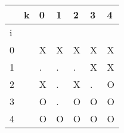 \documentclass{article}
\begin{document}
    \begin{center}

    \large
        \begin{tabular}{| m{.35cm} | m{.35cm} | m{.35cm} | m{.35cm} | m{.35cm} | m{.35cm} | m{.35cm} |}

            \hline
            & k & 0 & 1 & 2 & 3 & 4 \\
            \hline
            i & &  &  &  &  &  \\
            \hline
            0 & & X & X & X & X & X \\
            \hline
            1 & & . & . & . & X & X \\
            \hline
            2 & & X & . & X & . & O \\
            \hline
            3 & & O & . & O & O & O \\
            \hline
            4 & & O & O & O & O & O \\
            \hline
        
    \end{tabular}
    \end{center}
\end{document}
